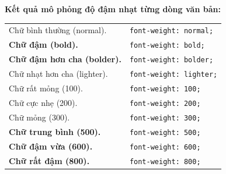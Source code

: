 \documentclass[11pt,oneside]{book}
\newcommand{\codeinline}[1]{\textcolor{accentOrange}{\texttt{#1}}}
\begin{document}
\begin{browserWindow}
\begin{tcolorbox}[arc=6pt, colback=white, colframe=blue!30, boxrule=1pt, top=12pt, bottom=12pt, left=16pt, right=16pt]
  {\sffamily\bfseries\color{primaryBlue}\large Kết quả mô phỏng độ đậm nhạt từng dòng văn bản:}\par\vspace{10pt}
  \begin{tabular}{@{}l l@{}}
    {\sffamily\fontsize{13}{17}\selectfont\color{blue!80!black} Chữ bình thường (normal).}  & {\sffamily\small\color{gray!70} \codeinline{font-weight: normal;}} \\ [5pt]
    {\sffamily\bfseries\fontsize{13}{17}\selectfont\color{blue!90!black} Chữ đậm (bold).}    & {\sffamily\small\color{gray!70} \codeinline{font-weight: bold;}} \\ [5pt]
    {\sffamily\bfseries\fontsize{13}{17}\selectfont\color{blue!95!black} Chữ đậm hơn cha (bolder).}  & {\sffamily\small\color{gray!70} \codeinline{font-weight: bolder;}} \\ [5pt]
    {\sffamily\fontsize{13}{17}\selectfont\color{blue!30!white} Chữ nhạt hơn cha (lighter).} & {\sffamily\small\color{gray!70} \codeinline{font-weight: lighter;}} \\ [5pt]
    {\sffamily\fontsize{13}{17}\selectfont\color{blue!35!white} Chữ rất mỏng (100).}     & {\sffamily\small\color{gray!70} \codeinline{font-weight: 100;}} \\ [5pt]
    {\sffamily\fontsize{13}{17}\selectfont\color{blue!50!white} Chữ cực nhẹ (200).}     & {\sffamily\small\color{gray!70} \codeinline{font-weight: 200;}} \\ [5pt]
    {\sffamily\fontsize{13}{17}\selectfont\color{blue!70!black} Chữ mỏng (300).}     & {\sffamily\small\color{gray!70} \codeinline{font-weight: 300;}} \\ [5pt]
    {\sffamily\bfseries\fontsize{13}{17}\selectfont\color{blue!85!black} Chữ trung bình (500).}     & {\sffamily\small\color{gray!70} \codeinline{font-weight: 500;}} \\ [5pt]
    {\sffamily\bfseries\fontsize{13}{17}\selectfont\color{blue!95!black} Chữ đậm vừa (600).}     & {\sffamily\small\color{gray!70} \codeinline{font-weight: 600;}} \\ [5pt]
    {\sffamily\bfseries\fontsize{13}{17}\selectfont\color{blue!100!black} Chữ rất đậm (800).}     & {\sffamily\small\color{gray!70} \codeinline{font-weight: 800;}} \\ [5pt]

\end{tabular}
\end{tcolorbox}
\end{browserWindow}
\end{document}
